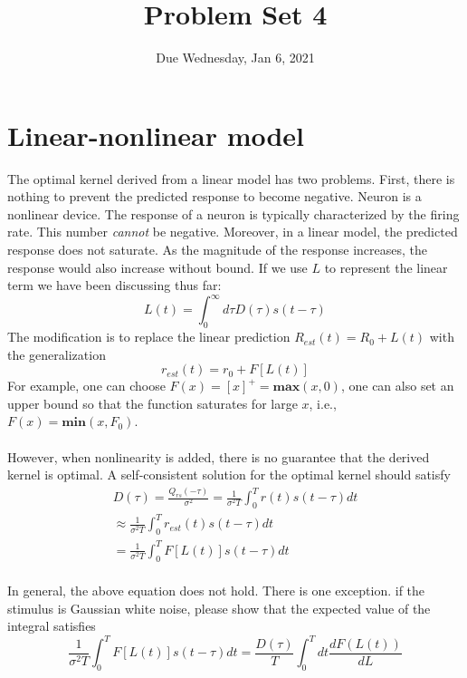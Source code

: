 \documentclass{article}
\title{Problem Set 4}
\date{Due Wednesday, Jan 6, 2021}
\begin{document}
\maketitle

\section*{Linear-nonlinear model}

The optimal kernel derived from a linear model has two problems. First, there is nothing to prevent the predicted response to become negative. Neuron is a nonlinear device. The response of a neuron is typically characterized by the firing rate. This number \textit{cannot} be negative. Moreover, in a linear model, the predicted response does not saturate. As the magnitude of the response increases, the response would also increase without bound. If we use $L$ to represent the linear term we have been discussing thus far:
\begin{equation}
L(t) = \int_0^\infty d\tau D(\tau) s(t-\tau)
\end{equation}
The modification is to replace the linear prediction $R_{est}(t) = R_0 + L(t)$ with the generalization 
\begin{equation}
r_{est}(t) = r_0 + F[L(t)] 
\end{equation}
For example, one can choose $F(x) = [x]^{+} = \mathbf{max}(x,0)$, one can also set an upper bound so that  the function saturates for large $x$, i.e., $F(x) = \mathbf{min}(x, F_0)$.  
\\
\\
However, when nonlinearity is added, there is no guarantee that the derived kernel is optimal. A self-consistent solution for the optimal kernel should satisfy 
\begin{equation}
\begin{split}
D(\tau) = \frac{Q_{rs} (-\tau)}{\sigma^2}=\frac{1}{\sigma^2 T}\int_0^T r(t)s(t-\tau)dt \\
	\approx \frac{1}{\sigma^2 T}\int_0^T r_{est}(t)s(t-\tau)dt\\
	= \frac{1}{\sigma^2 T}\int_0^T F[L(t)]s(t-\tau)dt  
\end{split}
\end{equation}
\\
In general, the above equation does not hold. There is one exception. if the stimulus is Gaussian white noise, please show that the expected value of the integral satisfies
\begin{equation}
\frac{1}{\sigma^2 T}\int_0^T F[L(t)]s(t-\tau)dt  = \frac{D(\tau)}{T}\int_0^T dt \frac{dF(L(t))}{dL}
\end{equation} 
\end{document}
